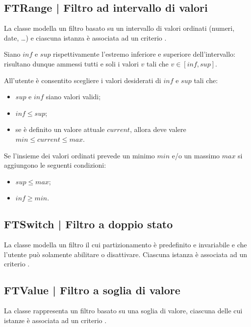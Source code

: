 \documentclass[10pt,a4paper,headinclude,footinclude,hidelinks]{scrreprt} %
\begin{document}
	\subsection[FTRange]{FTRange | Filtro ad intervallo di valori}
	\label{sec:stage:design:sistema:model.filter:range-filter}
	La classe \textit{} modella un filtro basato su un intervallo di valori ordinati (numeri, date, \ldots) e ciascuna istanza è associata ad un criterio \textit{}.

	Siano $inf$ e $sup$ rispettivamente l'estremo inferiore e superiore dell'intervallo: risultano dunque ammessi tutti e soli i valori $v$ tali che $v \in \left[inf,sup\right]$.

	All'utente è consentito scegliere i valori desiderati di $inf$ e $sup$ tali che:
	\begin{itemize}
	\item $sup$ e $inf$ siano valori validi;
	\item $inf \leq sup$;
	\item se è definito un valore attuale $current$, allora deve valere $min \leq current \leq max$.
	\end{itemize}

	Se l'insieme dei valori ordinati prevede un minimo $min$ e/o un massimo $max$ si aggiungono le seguenti condizioni:
	\begin{itemize}
	\item $sup \leq max$;
	\item $inf \geq min$.
	\end{itemize}

	\subsection[FTSwitch]{FTSwitch | Filtro a doppio stato}
	\label{sec:stage:design:sistema:model.filter:switch-filter}
	La classe \textit{} modella un filtro il cui partizionamento è predefinito e invariabile e che l'utente può solamente abilitare o disattivare. Ciascuna istanza è associata ad un criterio \textit{}.

	\subsection[FTValue]{FTValue | Filtro a soglia di valore}
	\label{sec:stage:design:sistema:model.filter:value-filter}
	La classe \textit{} rappresenta un filtro basato su una soglia di valore, ciascuna delle cui istanze è associata ad un criterio \textit{}.
\end{document}
